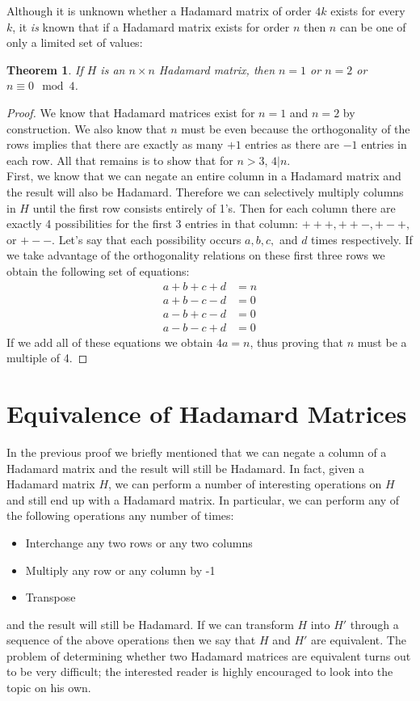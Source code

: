 \documentclass{article}
\newtheorem{theorem}{Theorem}[section]
\theoremstyle{definition}
\begin{document}
Although it is unknown whether a Hadamard matrix of order $4k$ exists for every $k$, it \emph{is} known that if a Hadamard matrix exists for order $n$ then $n$ can be one of only a limited set of values:
\begin{theorem}
If $H$ is an $n \times n$ Hadamard matrix, then $n = 1$ or $n = 2$ or $n \equiv 0 \mod 4$.
\end{theorem}

\begin{proof}
We know that Hadamard matrices exist for $n=1$ and $n=2$ by construction. We also know that $n$ must be even because the orthogonality of the rows implies that there are exactly as many $+1$ entries as there are $-1$ entries in each row. All that remains is to show that for $n > 3$, $4|n$.\\

First, we know that we can negate an entire column in a Hadamard matrix and the result will also be Hadamard. Therefore we can selectively multiply columns in $H$ until the first row consists entirely of 1's. Then for each column there are exactly 4 possibilities for the first 3 entries in that column: $+++, ++-, +-+,$ or $+--$. Let's say that each possibility occurs $a, b, c,$ and $d$ times respectively. If we take advantage of the orthogonality relations on these first three rows we obtain the following set of equations:
\begin{align*}
  a + b + c + d &= n\\
  a + b - c - d &= 0\\
  a - b + c - d &= 0\\
  a - b - c + d &= 0
\end{align*}
If we add all of these equations we obtain $4a = n$, thus proving that $n$ must be a multiple of 4.
\end{proof}

\section{Equivalence of Hadamard Matrices}
In the previous proof we briefly mentioned that we can negate a column of a Hadamard matrix and the result will still be Hadamard.
In fact, given a Hadamard matrix $H$, we can perform a number of interesting operations on $H$ and still end up with a Hadamard matrix. In particular, we can perform any of the following operations any number of times:
\begin{itemize}
  \item Interchange any two rows or any two columns
  \item Multiply any row or any column by -1
  \item Transpose
\end{itemize}
and the result will still be Hadamard. If we can transform $H$ into $H'$ through a sequence of the above operations then we say that $H$ and $H'$ are equivalent. The problem of determining whether two Hadamard matrices are equivalent turns out to be very difficult; the interested reader is highly encouraged to look into the topic on his own.\\
\end{document}
